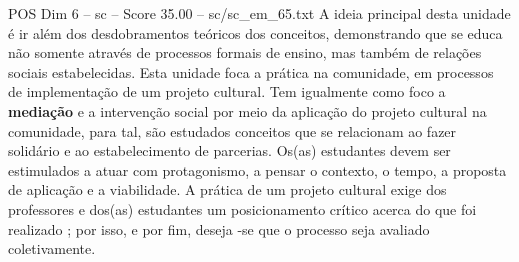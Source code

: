 \begin{textsample}{POS Dim 6 – sc – Score 35.00 – sc/sc\_em\_65.txt}
A ideia principal desta unidade é ir além dos desdobramentos teóricos dos conceitos, demonstrando que se educa não somente através de processos formais de ensino, mas também de relações sociais estabelecidas.
Esta unidade foca a prática na comunidade, em processos de implementação de um projeto cultural.
Tem igualmente como foco a \textbf{mediação} e a intervenção social por meio da aplicação do projeto cultural na comunidade, para tal, são estudados conceitos que se relacionam ao fazer solidário e ao estabelecimento de parcerias.
Os(as) estudantes devem ser estimulados a atuar com protagonismo, a pensar o contexto, o tempo, a proposta de aplicação e a viabilidade.
A prática de um projeto cultural exige dos professores e dos(as) estudantes um posicionamento crítico acerca do que foi realizado ; por isso, e por fim, deseja -se que o processo seja avaliado coletivamente.

\end{textsample}
